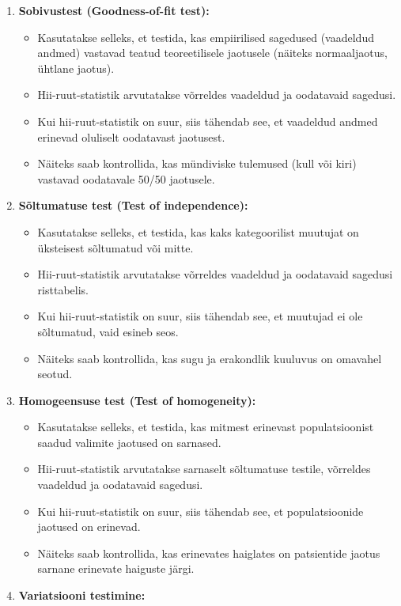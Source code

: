 \documentclass[
]{book}
\providecommand{\tightlist}{%
  \setlength{\itemsep}{0pt}\setlength{\parskip}{0pt}}
\begin{document}
\begin{enumerate}
\def\labelenumi{\arabic{enumi}.}
\tightlist
\item
  \textbf{Sobivustest (Goodness-of-fit test):}

  \begin{itemize}
  \tightlist
  \item
    Kasutatakse selleks, et testida, kas empiirilised sagedused (vaadeldud andmed) vastavad teatud teoreetilisele jaotusele (näiteks normaaljaotus, ühtlane jaotus).
  \item
    Hii-ruut-statistik arvutatakse võrreldes vaadeldud ja oodatavaid sagedusi.
  \item
    Kui hii-ruut-statistik on suur, siis tähendab see, et vaadeldud andmed erinevad oluliselt oodatavast jaotusest.
  \item
    Näiteks saab kontrollida, kas mündiviske tulemused (kull või kiri) vastavad oodatavale 50/50 jaotusele.
  \end{itemize}
\item
  \textbf{Sõltumatuse test (Test of independence):}

  \begin{itemize}
  \tightlist
  \item
    Kasutatakse selleks, et testida, kas kaks kategoorilist muutujat on üksteisest sõltumatud või mitte.
  \item
    Hii-ruut-statistik arvutatakse võrreldes vaadeldud ja oodatavaid sagedusi risttabelis.
  \item
    Kui hii-ruut-statistik on suur, siis tähendab see, et muutujad ei ole sõltumatud, vaid esineb seos.
  \item
    Näiteks saab kontrollida, kas sugu ja erakondlik kuuluvus on omavahel seotud.
  \end{itemize}
\item
  \textbf{Homogeensuse test (Test of homogeneity):}

  \begin{itemize}
  \tightlist
  \item
    Kasutatakse selleks, et testida, kas mitmest erinevast populatsioonist saadud valimite jaotused on sarnased.
  \item
    Hii-ruut-statistik arvutatakse sarnaselt sõltumatuse testile, võrreldes vaadeldud ja oodatavaid sagedusi.
  \item
    Kui hii-ruut-statistik on suur, siis tähendab see, et populatsioonide jaotused on erinevad.
  \item
    Näiteks saab kontrollida, kas erinevates haiglates on patsientide jaotus sarnane erinevate haiguste järgi.
  \end{itemize}
\item
  \textbf{Variatsiooni testimine:}


\end{enumerate}
\end{document}

